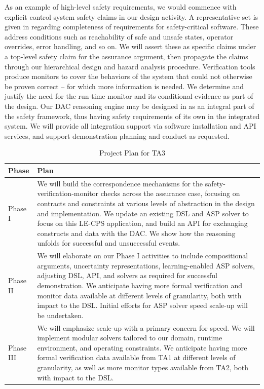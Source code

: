As an example of high-level safety requirements, we would commence with explicit control system safety claims in our design activity.  A representative set is given in \cite{NPR7150} regarding completeness of requirements for safety-critical software.  These address conditions such as reachability of safe and unsafe states, operator overrides, error handling, and so on.  We will assert these as specific claims under a top-level safety claim for the assurance argument, then propagate the claims through our hierarchical design and hazard analysis procedure.  
Verification tools produce monitors to cover the behaviors of the system that could not otherwise be proven correct -- for which more information is needed.  We determine and justify the need for the run-time monitor and its conditional evidence as part of the design.  
Our DAC reasoning engine may be designed in as an integral part of the safety framework, thus having safety requirements of its own in the integrated system.  We will provide all integration support via software installation and API services, and support demonstration planning and conduct as requested. 




\begin{table}
\caption{Project Plan for TA3}
  \centering
  {\footnotesize
\begin{tabular}{|m{.6in}|m{5.55in}|} 
\hline
\textbf{Phase} & \textbf{Plan} 
\\\hline
Phase I & 
We will build the correspondence mechanisms for the safety-verification-monitor checks across the assurance case, focusing on contracts and constraints at various levels of abstraction in the design and implementation.  We update an existing DSL and ASP solver to focus on this LE-CPS application, and build an API for exchanging constructs and data with the DAC.  We show how the reasoning unfolds for successful and unsuccessful events.   
\\ \hline
Phase II & 
We will elaborate on our Phase I activities to include compositional arguments, uncertainty representations, learning-enabled ASP solvers, adjusting DSL, API, and solvers as required for successful demonstration.  We anticipate having more formal verification and monitor data available at different levels of granularity, both with impact to the DSL. Initial efforts for ASP solver speed scale-up will be undertaken.  
\\ \hline
Phase III & 
We will emphasize scale-up with a primary concern for speed. We will implement modular solvers tailored to our domain, runtime environment, and operating constraints. We  anticipate having more formal verification data available from TA1 at different levels of granularity, as well as more monitor types available from TA2, both with impact to the DSL.
\\ \hline
\end{tabular}
}
\label{tab:ta3:plan}
\end{table}

